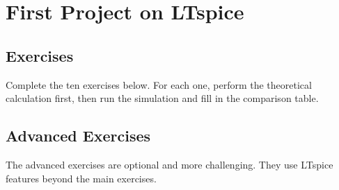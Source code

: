 \chapter{First Project on LTspice}




\clearpage
\section{Exercises}
Complete the ten exercises below. For each one, perform the theoretical calculation first,
then run the simulation and fill in the comparison table.












\clearpage
\section{Advanced Exercises}
The advanced exercises are optional and more challenging. They use LTspice features beyond the main exercises.





